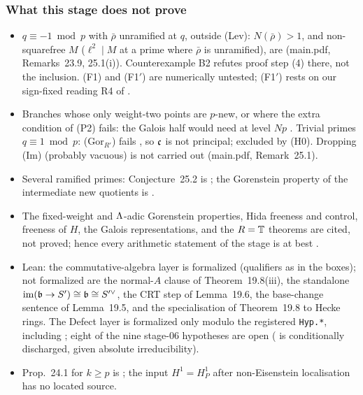 \subsubsection*{What this stage does not prove}
\begin{itemize}
\item $q\equiv-1\bmod p$ with $\bar\rho$ unramified at $q$, outside (Lev): $N(\bar\rho)>1$, and non-squarefree $M$ ($\ell^2\mid M$ at a prime
  where $\bar\rho$ is unramified), are \stopen{} (main.pdf, Remarks~23.9, 25.1(i)). Counterexample B2 refutes proof step (4) there, not the
  inclusion. (F1) and (F1$'$) are numerically untested; (F1$'$) rests on our sign-fixed reading R4 of \cite[Thm~3.14]{KO}.
\item Branches whose only weight-two points are $p$-new, or where the extra condition of (P2) fails: the Galois half would need \cite{KO} at
  level $Np$ \stopen. Trivial primes $q\equiv1\bmod p$: (Gor$_{R'}$) fails \cite[Thm~1.2]{BKM} \stcited, so $\mathfrak{c}$ is not principal; excluded by
  (H0). Dropping (Im) (probably vacuous) is not carried out (main.pdf, Remark~25.1).
\item Several ramified primes: Conjecture~25.2 is \stconj; the Gorenstein property of the intermediate new quotients is \stopen.
\item The fixed-weight and $\Lambda$-adic Gorenstein properties, Hida freeness and control, freeness of $H$, the Galois representations, and
  the $R=\mathbb{T}$ theorems are cited, not proved; hence every arithmetic statement of the stage is at best \stpmc.
\item Lean: the commutative-algebra layer is formalized (qualifiers as in the boxes); not formalized are the normal-$A$ clause of
  Theorem~19.8(iii), the standalone $\mathrm{im}(\mathfrak{b}\to S')\cong\mathfrak{b}\cong S'^\vee$, the CRT step of Lemma~19.6, the base-change sentence of
  Lemma~19.5, and the specialisation of Theorem~19.8 to Hecke rings. The Defect layer is formalized only modulo the registered
  \texttt{Hyp.*}, including ; eight of the nine stage-06 hypotheses are open ( is
  conditionally discharged, given absolute irreducibility).
\item Prop.~24.1 for $k\ge p$ is \stexp; the input $H^1=H^1_P$ after non-Eisenstein localisation has no located source.
\end{itemize}
